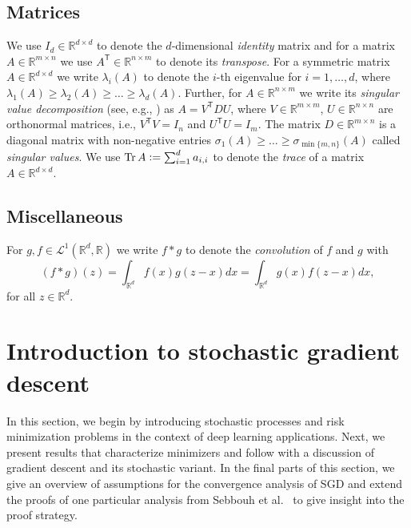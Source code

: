 \documentclass[12pt]{article}
\theoremstyle{definition}
\numberwithin{equation}{section}
\newcommand{\R}{\mathbb{R}}
\newcommand{\CL}{\mathcal{L}}
\newcommand{\T}{\mathsf{T}}
\newcommand{\defeq}{\vcentcolon=}
\DeclareMathOperator{\Tr}{Tr}
\begin{document}
\subsection{Matrices}
We use $I_d \in \R^{d \times d}$ to denote the $d$-dimensional \emph{identity} matrix and for a matrix $A \in \R^{m \times n}$ we use $A^\T \in \R^{n \times m}$ to denote its \emph{transpose}.
For a symmetric matrix $A \in \R^{d \times d}$ we write $\lambda_i(A)$ to denote the $i$-th eigenvalue for $i=1,\dots,d$, where $\lambda_1(A) \geq \lambda_2(A) \geq \dots \geq \lambda_d(A)$. Further, for $A \in \R^{n \times m}$ we write its \emph{singular value decomposition} (see, e.g., \cite{lycheNumericalLinearAlgebra2020}) as $A = V^\T D U$, where $V \in \R^{m \times m}$, $U \in \R^{n \times n}$ are orthonormal matrices, i.e., $V^\T V = I_n$ and $U^\T U = I_m$. The matrix $D \in \R^{m \times n}$ is a diagonal matrix with non-negative entries $\sigma_1(A) \geq \dots \geq \sigma_{\min\{m,n\}}(A)$ called \emph{singular values}. We use $\Tr A \defeq \sum_{i=1}^d a_{i,i}$ to denote the \emph{trace} of a matrix $A \in \R^{d \times d}$.
\subsection{Miscellaneous}
For $g,f \in \CL^1(\R^d, \R)$ we write $f*g$ to denote the \emph{convolution} of $f$ and $g$ with 
\begin{equation*}
  (f*g)(z) = \int_{\R^d} f(x)g(z-x)dx = \int_{\R^d} g(x)f(z-x)dx,
\end{equation*}
for all $z \in \R^d$.
\section{Introduction to stochastic gradient descent}
\label{sec:stochastic_optimization}
In this section, we begin by introducing stochastic processes and risk minimization problems in the context of deep learning applications. Next, we present results that characterize minimizers and follow with a discussion of gradient descent and its stochastic variant. In the final parts of this section, we give an overview of assumptions for the convergence analysis of SGD and extend the proofs of one particular analysis from Sebbouh et al.\ \cite{sebbouhAlmostSureConvergence2021} to give insight into the proof strategy.
\end{document}
